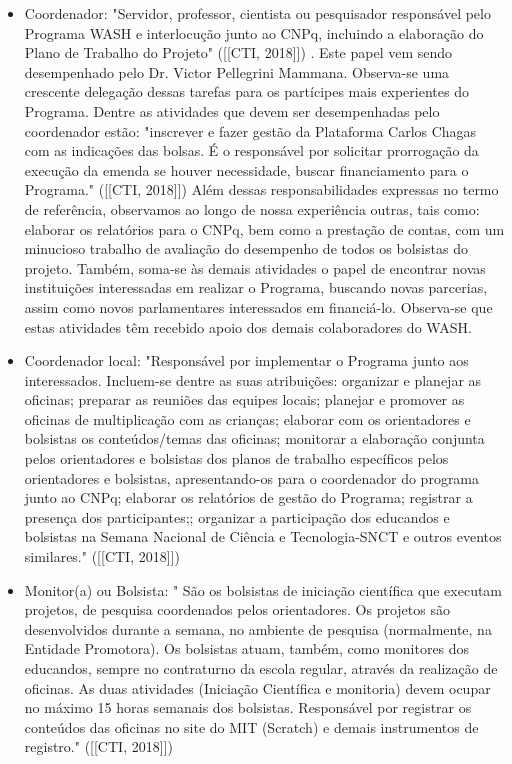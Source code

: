 \begin{itemize}
\item Coordenador: "Servidor, professor, cientista ou pesquisador responsável pelo Programa WASH e interlocução junto ao CNPq, incluindo a elaboração do Plano de Trabalho do Projeto"  ([[CTI, 2018]]) . Este papel vem sendo desempenhado pelo Dr. Victor Pellegrini Mammana. Observa-se uma crescente delegação dessas tarefas para os partícipes mais experientes do Programa. Dentre as atividades que devem ser desempenhadas pelo coordenador estão: "inscrever e fazer gestão da Plataforma Carlos Chagas com as indicações das bolsas. É o responsável por solicitar prorrogação da execução da emenda se houver necessidade, buscar financiamento para o Programa."  ([[CTI, 2018]]) Além dessas responsabilidades expressas no termo de referência, observamos ao longo de nossa experiência outras, tais como: elaborar os relatórios para o CNPq, bem como a prestação de contas, com um minucioso trabalho de avaliação do desempenho de todos os bolsistas do projeto. Também, soma-se às demais atividades o papel de encontrar novas instituições interessadas em realizar o Programa, buscando novas parcerias, assim como novos parlamentares interessados em financiá-lo. Observa-se que estas atividades têm recebido apoio dos demais colaboradores do WASH.
\item Coordenador local: "Responsável por implementar o Programa junto aos interessados. Incluem-se dentre as suas atribuições: organizar e planejar as oficinas; preparar as reuniões das equipes locais; planejar e promover as oficinas de multiplicação com as crianças; elaborar com os orientadores e bolsistas os conteúdos/temas das oficinas; monitorar a elaboração conjunta pelos orientadores e bolsistas dos planos de trabalho específicos pelos orientadores e bolsistas, apresentando-os para o coordenador do programa junto ao CNPq; elaborar os relatórios de gestão do Programa; registrar a presença dos participantes;; organizar a participação dos educandos e bolsistas na Semana Nacional de Ciência e Tecnologia-SNCT e outros eventos similares."  ([[CTI, 2018]])
\item Monitor(a) ou Bolsista: " São os bolsistas de iniciação científica que executam projetos, de pesquisa coordenados pelos orientadores. Os projetos são desenvolvidos durante a semana, no ambiente de pesquisa (normalmente, na Entidade Promotora). Os bolsistas atuam, também, como monitores dos educandos, sempre no contraturno da escola regular, através da realização de oficinas. As duas atividades (Iniciação Científica e monitoria) devem ocupar no máximo 15 horas semanais dos bolsistas. Responsável por registrar os conteúdos das oficinas no site do MIT (Scratch) e demais instrumentos de registro."  ([[CTI, 2018]])

\end{itemize}
